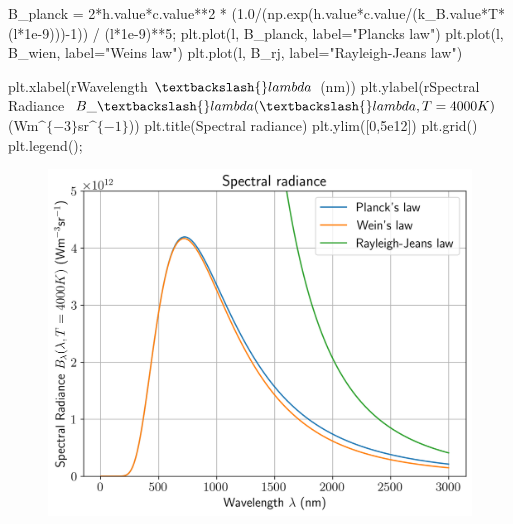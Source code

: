 \documentclass[
  letterpaper,
  DIV=11,
  numbers=noendperiod]{scrreprt}
\newenvironment{Shaded}{\begin{snugshade}}{\end{snugshade}}
\newcommand{\DecValTok}[1]{\textcolor[rgb]{0.68,0.00,0.00}{#1}}
\newcommand{\FloatTok}[1]{\textcolor[rgb]{0.68,0.00,0.00}{#1}}
\newcommand{\NormalTok}[1]{\textcolor[rgb]{0.00,0.23,0.31}{#1}}
\newcommand{\OperatorTok}[1]{\textcolor[rgb]{0.37,0.37,0.37}{#1}}
\newcommand{\StringTok}[1]{\textcolor[rgb]{0.13,0.47,0.30}{#1}}
\newcommand{\VerbatimStringTok}[1]{\textcolor[rgb]{0.13,0.47,0.30}{#1}}
\begin{document}
\begin{Shaded}
\begin{Highlighting}[]
\NormalTok{B\_planck }\OperatorTok{=} \DecValTok{2}\OperatorTok{*}\NormalTok{h.value}\OperatorTok{*}\NormalTok{c.value}\OperatorTok{**}\DecValTok{2} \OperatorTok{*}\NormalTok{ (}\FloatTok{1.0}\OperatorTok{/}\NormalTok{(np.exp(h.value}\OperatorTok{*}\NormalTok{c.value}\OperatorTok{/}\NormalTok{(k\_B.value}\OperatorTok{*}\NormalTok{T}\OperatorTok{*}\NormalTok{(l}\OperatorTok{*}\FloatTok{1e{-}9}\NormalTok{)))}\OperatorTok{{-}}\DecValTok{1}\NormalTok{)) }\OperatorTok{/}\NormalTok{ (l}\OperatorTok{*}\FloatTok{1e{-}9}\NormalTok{)}\OperatorTok{**}\DecValTok{5}\OperatorTok{;}
\NormalTok{plt.plot(l, B\_planck, label}\OperatorTok{=}\StringTok{"Planck\textquotesingle{}s law"}\NormalTok{)}
\NormalTok{plt.plot(l, B\_wien, label}\OperatorTok{=}\StringTok{"Wein\textquotesingle{}s law"}\NormalTok{)}
\NormalTok{plt.plot(l, B\_rj, label}\OperatorTok{=}\StringTok{"Rayleigh{-}Jeans law"}\NormalTok{)}

\NormalTok{plt.xlabel(}\VerbatimStringTok{r\textquotesingle{}Wavelength $\textbackslash{}lambda$ (nm)\textquotesingle{}}\NormalTok{)}
\NormalTok{plt.ylabel(}\VerbatimStringTok{r\textquotesingle{}Spectral Radiance $B\_\textbackslash{}lambda(\textbackslash{}lambda, T=4000K)$ (Wm$\^{}\{{-}3\}$sr$\^{}\{{-}1\}$)\textquotesingle{}}\NormalTok{)}
\NormalTok{plt.title(}\StringTok{\textquotesingle{}Spectral radiance\textquotesingle{}}\NormalTok{)}
\NormalTok{plt.ylim([}\DecValTok{0}\NormalTok{,}\FloatTok{5e12}\NormalTok{])}
\NormalTok{plt.grid()}
\NormalTok{plt.legend()}\OperatorTok{;}
\end{Highlighting}
\end{Shaded}

\begin{figure}[H]

{\centering \includegraphics{SP1.1_-_Stellar_Properties_files/figure-pdf/cell-21-output-1.png}

}

\end{figure}
\end{document}
